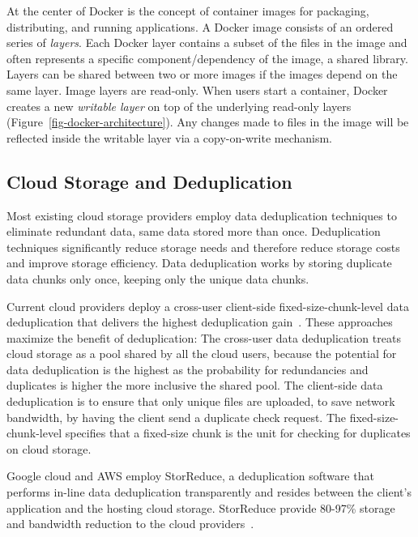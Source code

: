 At the center of Docker is the concept of container images for packaging, distributing, and running applications.
A Docker image consists of an ordered series of \emph{layers}.
Each Docker layer contains a subset of the files in the image and often represents a specific component/dependency of the image, \eg a shared library.
Layers can be shared between two or more images if the images depend on the same layer.
Image layers are read-only.
When users start a container, Docker creates a new \emph{writable layer} on top of the underlying read-only layers (Figure~\ref{fig-docker-architecture}).
Any changes made to files in the image will be reflected inside the writable layer via a copy-on-write mechanism.


\subsection{Cloud Storage and Deduplication}
 
Most existing cloud storage providers employ data deduplication techniques to eliminate redundant data, same data stored more than once. 
Deduplication techniques significantly reduce storage needs and therefore reduce storage costs and improve storage efficiency. 
Data deduplication works by storing duplicate data chunks only once, keeping only the unique data chunks. 

Current cloud providers deploy a cross-user client-side fixed-size-chunk-level data deduplication that delivers the highest deduplication gain~\cite{pooranian2018rare}. 
These approaches maximize the benefit of deduplication: 
The cross-user data deduplication treats cloud storage as a pool shared by all the cloud users, because the potential for 
data deduplication is the highest as the probability for redundancies and duplicates is higher the more inclusive the shared pool. 
The client-side data deduplication is to ensure that only unique files are uploaded, to save network bandwidth, by having the client send a duplicate check request. 
The fixed-size-chunk-level specifies that a fixed-size chunk is the unit for checking for duplicates on cloud storage.

Google cloud and AWS employ StorReduce, a deduplication software that performs in-line data deduplication transparently and resides between the client's application and the hosting cloud storage. StorReduce provide 80-97\% storage and bandwidth reduction to the cloud providers~\cite{StorReduce_google}.


